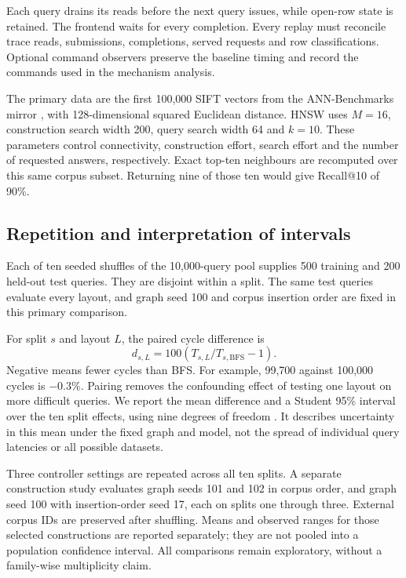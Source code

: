 \documentclass[conference]{IEEEtran}
\begin{document}
Each query drains its reads before the next query issues, while open-row state is retained. The frontend waits for every completion. Every replay must reconcile trace reads, submissions, completions, served requests and row classifications. Optional command observers preserve the baseline timing and record the commands used in the mechanism analysis.

The primary data are the first 100,000 SIFT vectors from the ANN-Benchmarks mirror \cite{annbench}, with 128-dimensional squared Euclidean distance. HNSW uses $M=16$, construction search width 200, query search width 64 and $k=10$. These parameters control connectivity, construction effort, search effort and the number of requested answers, respectively. Exact top-ten neighbours are recomputed over this same corpus subset. Returning nine of those ten would give Recall@10 of 90\%.

\subsection{Repetition and interpretation of intervals}
Each of ten seeded shuffles of the 10,000-query pool supplies 500 training and 200 held-out test queries. They are disjoint within a split. The same test queries evaluate every layout, and graph seed 100 and corpus insertion order are fixed in this primary comparison.

For split $s$ and layout $L$, the paired cycle difference is
\begin{equation}
 d_{s,L}=100\left(T_{s,L}/T_{s,\mathrm{BFS}}-1\right).
\end{equation}
Negative means fewer cycles than BFS. For example, 99,700 against 100,000 cycles is $-0.3\%$. Pairing removes the confounding effect of testing one layout on more difficult queries. We report the mean difference and a Student 95\% interval over the ten split effects, using nine degrees of freedom \cite{student}. It describes uncertainty in this mean under the fixed graph and model, not the spread of individual query latencies or all possible datasets.

Three controller settings are repeated across all ten splits. A separate construction study evaluates graph seeds 101 and 102 in corpus order, and graph seed 100 with insertion-order seed 17, each on splits one through three. External corpus IDs are preserved after shuffling. Means and observed ranges for those selected constructions are reported separately; they are not pooled into a population confidence interval. All comparisons remain exploratory, without a family-wise multiplicity claim.
\end{document}
